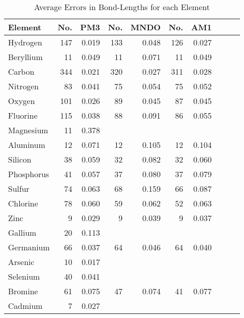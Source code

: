\begin{table}
\caption{\label{elegeos} Average Errors  in Bond-Lengths for each Element}
\begin{center}
\begin{tabular}{lrrrrrrrrr}
Element    &    No.  &  PM3     &      No. & MNDO & No.  & AM1  \\ \hline
Hydrogen   &     147 &    0.019 &     133 &    0.048 &     126 &    0.027 &  \\
Beryllium  &      11 &    0.049 &      11 &    0.071 &      11 &    0.049 &  \\
Carbon     &     344 &    0.021 &     320 &    0.027 &     311 &    0.028 &  \\
Nitrogen   &      83 &    0.041 &      75 &    0.054 &      75 &    0.052 &  \\
Oxygen     &     101 &    0.026 &      89 &    0.045 &      87 &    0.045 &  \\
Fluorine   &     115 &    0.038 &      88 &    0.091 &      86 &    0.055 &  \\
Magnesium  &      11 &    0.378 &         &          &         &          &   \\
Aluminum   &      12 &    0.071 &      12 &    0.105 &      12 &    0.104 &  \\
Silicon    &      38 &    0.059 &      32 &    0.082 &      32 &    0.060 &  \\
Phosphorus &      41 &    0.057 &      37 &    0.080 &      37 &    0.079 &  \\
Sulfur     &      74 &    0.063 &      68 &    0.159 &      66 &    0.087 &  \\
Chlorine   &      78 &    0.060 &      59 &    0.062 &      52 &    0.063 &  \\
Zinc       &       9 &    0.029 &       9 &    0.039 &       9 &    0.037 &  \\
Gallium    &      20 &    0.113 &         &          &         &          &   \\
Germanium  &      66 &    0.037 &      64 &    0.046 &      64 &    0.040 &  \\
Arsenic    &      10 &    0.017 &         &          &         &          &   \\
Selenium   &      40 &    0.041 &         &          &         &          &   \\
Bromine    &      61 &    0.075 &      47 &    0.074 &      41 &    0.077 &  \\
Cadmium    &       7 &    0.027 &         &          &         &          &   \\

\end{tabular}
\end{center}
\end{table}

